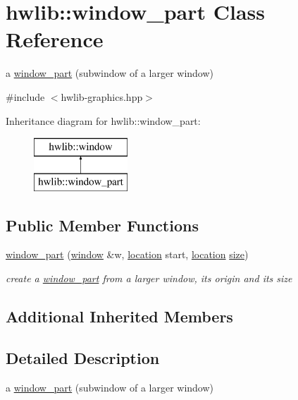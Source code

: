 \hypertarget{classhwlib_1_1window__part}{}\section{hwlib\+:\+:window\+\_\+part Class Reference}
\label{classhwlib_1_1window__part}


a \hyperlink{classhwlib_1_1window__part}{window\+\_\+part} (subwindow of a larger window)  




{\ttfamily \#include $<$hwlib-\/graphics.\+hpp$>$}

Inheritance diagram for hwlib\+:\+:window\+\_\+part\+:\begin{figure}[H]
\begin{center}
\leavevmode
\includegraphics[height=2.000000cm]{classhwlib_1_1window__part}
\end{center}
\end{figure}
\subsection*{Public Member Functions}
\begin{DoxyCompactItemize}
\item 
\hyperlink{classhwlib_1_1window__part_a61d5cdec717d38ea7e013259b6c68ab9}{window\+\_\+part} (\hyperlink{classhwlib_1_1window}{window} \&w, \hyperlink{classhwlib_1_1location}{location} start, \hyperlink{classhwlib_1_1location}{location} \hyperlink{classhwlib_1_1window_ad2ad5281c9c09d18010b19cb807d3eaa}{size})
\begin{DoxyCompactList}\small\item\em create a \hyperlink{classhwlib_1_1window__part}{window\+\_\+part} from a larger window, its origin and its size \end{DoxyCompactList}\end{DoxyCompactItemize}
\subsection*{Additional Inherited Members}


\subsection{Detailed Description}
a \hyperlink{classhwlib_1_1window__part}{window\+\_\+part} (subwindow of a larger window) 

